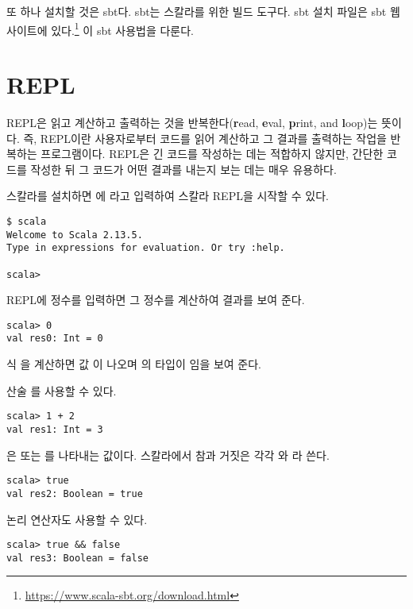 또 하나 설치할 것은 sbt다. sbt는 스칼라를 위한 빌드 도구다. sbt 설치
파일은 sbt 웹 사이트에 있다.\footnote{\url{https://www.scala-sbt.org/download.html}}
이 sbt 사용법을 다룬다.

\section{REPL}

REPL은 읽고 계산하고 출력하는 것을 반복한다(\textbf{r}ead,
\textbf{e}val, \textbf{p}rint, and \textbf{l}oop)는
뜻이다. 즉, REPL이란 사용자로부터 코드를 읽어 계산하고 그 결과를 출력하는 작업을
반복하는 프로그램이다. REPL은 긴 코드를 작성하는 데는 적합하지 않지만, 간단한
코드를 작성한 뒤 그 코드가 어떤 결과를 내는지 보는 데는 매우 유용하다.

스칼라를 설치하면 에 라고 입력하여 스칼라 REPL을 시작할 수 있다.

\begin{verbatim}
$ scala
Welcome to Scala 2.13.5.
Type in expressions for evaluation. Or try :help.

scala>
\end{verbatim}

REPL에 정수를 입력하면 그 정수를 계산하여 결과를 보여 준다.

\begin{verbatim}
scala> 0
val res0: Int = 0
\end{verbatim}

식 을 계산하면 값 이 나오며 의 타입이 임을 보여 준다.

산술 를 사용할 수 있다.

\begin{verbatim}
scala> 1 + 2
val res1: Int = 3
\end{verbatim}

은  또는 를 나타내는
값이다. 스칼라에서 참과 거짓은 각각 와 라 쓴다.

\begin{verbatim}
scala> true
val res2: Boolean = true
\end{verbatim}

논리 연산자도 사용할 수 있다.

\begin{verbatim}
scala> true && false
val res3: Boolean = false
\end{verbatim}

